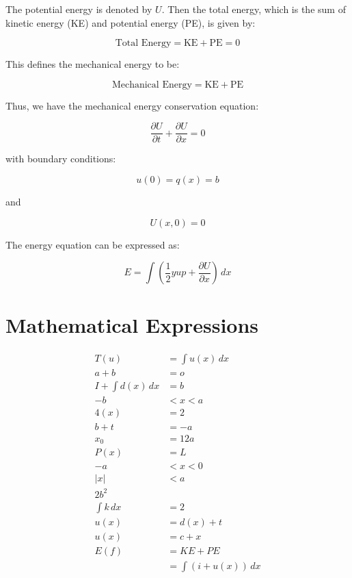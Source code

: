 \documentclass[11pt]{article}
\begin{document}
The potential energy is denoted by \( U \). Then the total energy, which is the sum of kinetic energy (KE) and potential energy (PE), is given by:

\[
\text{Total Energy} = \text{KE} + \text{PE} = 0
\]

This defines the mechanical energy to be:

\[
\text{Mechanical Energy} = \text{KE} + \text{PE}
\]

Thus, we have the mechanical energy conservation equation:

\[
\frac{\partial U}{\partial t} + \frac{\partial U}{\partial x} = 0
\]

with boundary conditions:

\[
u(0) = q(x) = b
\]

and

\[
U(x, 0) = 0
\]

The energy equation can be expressed as:

\[
E = \int \left( \frac{1}{2} y u p + \frac{\partial U}{\partial x} \right) \, dx
\]



\clearpage

\section*{Mathematical Expressions}

\begin{align*}
    T(u) &= \int u(x) \, dx \\
    a + b &= o \\
    I + \int d(x) \, dx &= b \\
    -b &< x < a \\
    4(x) &= 2 \\
    b + t &= -a \\
    x_0 &= 12a \\
    P(x) &= L \\
    -a &< x < 0 \\
    |x| &< a \\
    2b^2 \\
    \int k \, dx &= 2 \\
    u(x) &= d(x) + t \\
    u(x) &= c + x \\
    E(f) &= KE + PE \\
    &= \int (i + u(x)) \, dx
\end{align*}

\end{document}
